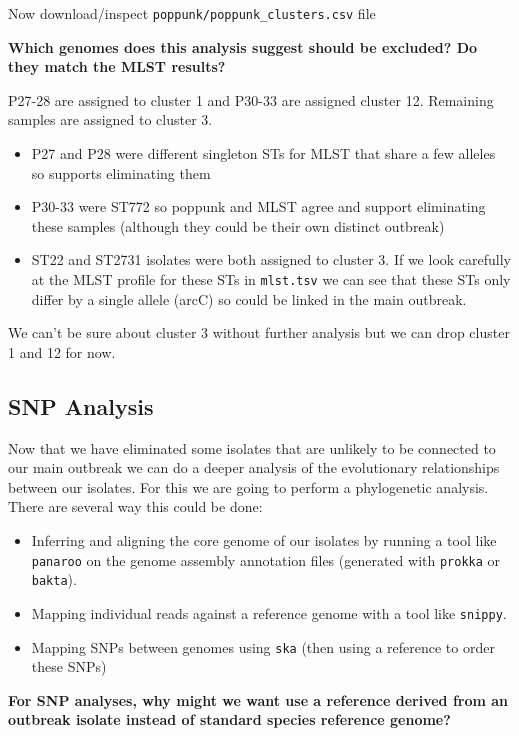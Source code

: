 \documentclass[
]{book}
\providecommand{\tightlist}{%
  \setlength{\itemsep}{0pt}\setlength{\parskip}{0pt}}
\begin{document}
Now download/inspect \texttt{poppunk/poppunk\_clusters.csv} file

\textbf{Which genomes does this analysis suggest should be excluded? Do they match the MLST results?}

P27-28 are assigned to cluster 1 and P30-33 are assigned cluster 12. Remaining samples are assigned to cluster 3.

\begin{itemize}
\tightlist
\item
  P27 and P28 were different singleton STs for MLST that share a few alleles so supports eliminating them
\item
  P30-33 were ST772 so poppunk and MLST agree and support eliminating these samples (although they could be their own distinct outbreak)
\item
  ST22 and ST2731 isolates were both assigned to cluster 3. If we look carefully at the MLST profile for these STs in \texttt{mlst.tsv} we can see that these STs only differ by a single allele (arcC) so could be linked in the main outbreak.
\end{itemize}

We can't be sure about cluster 3 without further analysis but we can drop cluster 1 and 12 for now.

\subsection{SNP Analysis}\label{snp}

Now that we have eliminated some isolates that are unlikely to be connected to our main outbreak we can do a deeper analysis of the evolutionary relationships between our isolates. For this we are going to perform a phylogenetic analysis. There are several way this could be done:

\begin{itemize}
\tightlist
\item
  Inferring and aligning the core genome of our isolates by running a tool like \texttt{panaroo} on the genome assembly annotation files (generated with \texttt{prokka} or \texttt{bakta}).
\item
  Mapping individual reads against a reference genome with a tool like \texttt{snippy}.
\item
  Mapping SNPs between genomes using \texttt{ska} (then using a reference to order these SNPs)
\end{itemize}

\textbf{For SNP analyses, why might we want use a reference derived from an outbreak isolate instead of standard species reference genome?}
\end{document}
